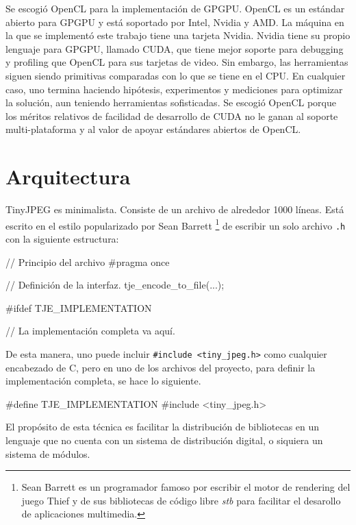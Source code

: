 Se escogió OpenCL para la implementación de GPGPU. OpenCL es un estándar abierto
para GPGPU y está soportado por Intel, Nvidia y AMD. La máquina en la que se
implementó este trabajo tiene una tarjeta Nvidia. Nvidia tiene su propio
lenguaje para GPGPU, llamado CUDA, que tiene mejor soporte para debugging y
profiling que OpenCL para sus tarjetas de video. Sin embargo, las herramientas
siguen siendo primitivas comparadas con lo que se tiene en el CPU. En cualquier
caso, uno termina haciendo hipótesis, experimentos y mediciones para optimizar la
solución, aun teniendo herramientas sofisticadas. Se escogió OpenCL porque los
méritos relativos de facilidad de desarrollo de CUDA no le ganan al soporte
multi-plataforma y al valor de apoyar estándares abiertos de OpenCL.

\section{Arquitectura}

TinyJPEG es minimalista. Consiste de un archivo de alrededor 1000 líneas. Está
escrito en el estilo popularizado por Sean Barrett \footnote{Sean Barrett es un
programador famoso por escribir el motor de rendering del juego Thief y de sus
bibliotecas de código libre \emph{stb} para facilitar el desarollo de
aplicaciones multimedia.} de escribir un solo archivo \verb+.h+ con la
siguiente estructura:

\label{alg:stb}
\begin{code}[language=C][h]
    // Principio del archivo
    #pragma once

    // Definición de la interfaz.
    tje_encode_to_file(...);

    #ifdef TJE_IMPLEMENTATION

    // La implementación completa va aquí.
\end{code}

De esta manera, uno puede incluir \verb+#include <tiny_jpeg.h>+ como cualquier
encabezado de C, pero en uno de los archivos del proyecto, para definir la
implementación completa, se hace lo siguiente.

\label{alg:stb_impl}
\begin{code}[language=C][h]
    #define TJE_IMPLEMENTATION
    #include <tiny_jpeg.h>
\end{code}

El propósito de esta técnica es facilitar la distribución de bibliotecas en un
lenguaje que no cuenta con un sistema de distribución digital, o siquiera un
sistema de módulos.

